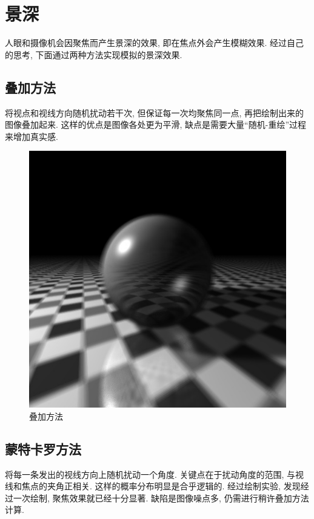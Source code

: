 \documentclass[10pt,twocolumn]{article}
\begin{document}
\section{\hei 景深}
人眼和摄像机会因聚焦而产生景深的效果, 即在焦点外会产生模糊效果. 经过自己的思考, 下面通过两种方法实现模拟的景深效果.

\subsection{\hei 叠加方法}
将视点和视线方向随机扰动若干次, 但保证每一次均聚焦同一点, 再把绘制出来的图像叠加起来. 这样的优点是图像各处更为平滑, 缺点是需要大量“随机-重绘”过程来增加真实感.

\begin{figure}[ht]
\centering
\includegraphics[scale=.4]{fig12.jpg}
\caption{叠加方法}
\end{figure}

\newpage

\subsection{\hei 蒙特卡罗方法}
将每一条发出的视线方向上随机扰动一个角度. 关键点在于扰动角度的范围, 与视线和焦点的夹角正相关. 这样的概率分布明显是合乎逻辑的. 经过绘制实验, 发现经过一次绘制, 聚焦效果就已经十分显著. 缺陷是图像噪点多, 仍需进行稍许叠加方法计算.
\end{document}

